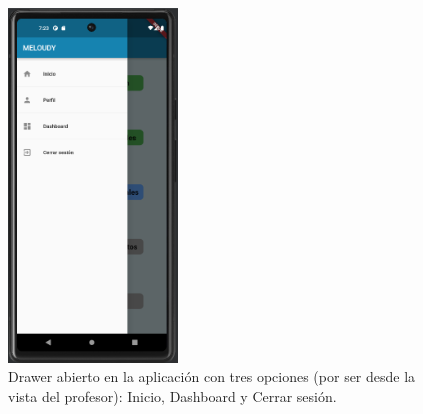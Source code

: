 \begin{figure}[H]
    \centering
    \includegraphics[width=0.4\textwidth]{imagenes/c7/drawer.png}
    \caption{Drawer abierto en la aplicación con tres opciones (por ser desde la vista del profesor): Inicio, Dashboard y Cerrar sesión.}
    \label{fig:drawer}
\end{figure}


